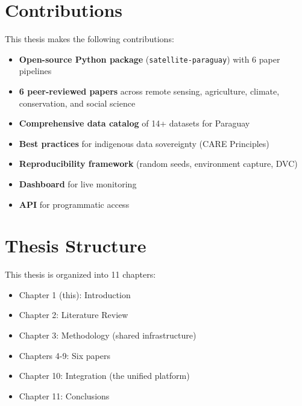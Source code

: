 \section{Contributions}

This thesis makes the following contributions:

\begin{itemize}
    \item \textbf{Open-source Python package} (\texttt{satellite-paraguay}) with 6 paper pipelines
    \item \textbf{6 peer-reviewed papers} across remote sensing, agriculture, climate, conservation, and social science
    \item \textbf{Comprehensive data catalog} of 14+ datasets for Paraguay
    \item \textbf{Best practices} for indigenous data sovereignty (CARE Principles)
    \item \textbf{Reproducibility framework} (random seeds, environment capture, DVC)
    \item \textbf{Dashboard} for live monitoring
    \item \textbf{API} for programmatic access
\end{itemize}

\section{Thesis Structure}

This thesis is organized into 11 chapters:

\begin{itemize}
    \item Chapter 1 (this): Introduction
    \item Chapter 2: Literature Review
    \item Chapter 3: Methodology (shared infrastructure)
    \item Chapters 4-9: Six papers
    \item Chapter 10: Integration (the unified platform)
    \item Chapter 11: Conclusions
\end{itemize}
